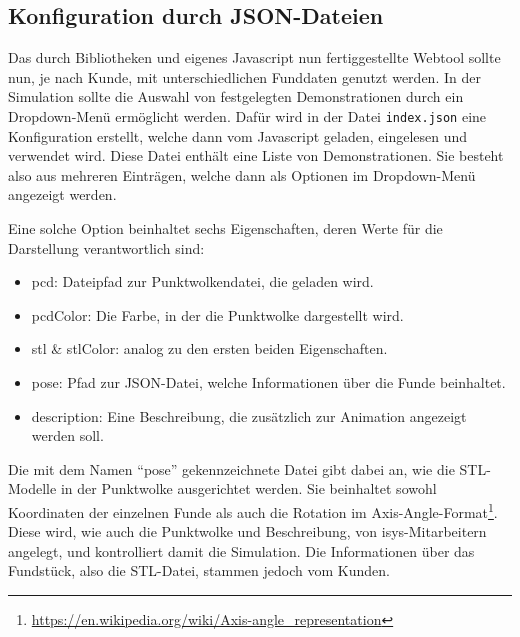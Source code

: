 \subsection{Konfiguration durch JSON-Dateien}

Das durch Bibliotheken und eigenes Javascript nun fertiggestellte Webtool sollte nun, je nach Kunde, mit unterschiedlichen Funddaten genutzt werden. In der Simulation sollte die Auswahl von festgelegten Demonstrationen durch ein Dropdown-Menü ermöglicht werden. Dafür wird in der Datei \texttt{index.json} eine Konfiguration erstellt, welche dann vom Javascript geladen, eingelesen und verwendet wird. Diese Datei enthält eine Liste von Demonstrationen. Sie besteht also aus mehreren Einträgen, welche dann als Optionen im Dropdown-Menü angezeigt werden.

\begin{code}
\end{code}

Eine solche Option beinhaltet sechs Eigenschaften, deren Werte für die Darstellung verantwortlich sind:

\begin{itemize}
	\item pcd: Dateipfad zur Punktwolkendatei, die geladen wird.
	\item pcdColor: Die Farbe, in der die Punktwolke dargestellt wird.
	\item stl \& stlColor: analog zu den ersten beiden Eigenschaften.
	\item pose: Pfad zur JSON-Datei, welche Informationen über die Funde beinhaltet.
	\item description: Eine Beschreibung, die zusätzlich zur Animation angezeigt werden soll.
\end{itemize}

Die mit dem Namen ``pose'' gekennzeichnete Datei gibt dabei an, wie die STL-Modelle in der Punktwolke ausgerichtet werden. Sie beinhaltet sowohl Koordinaten der einzelnen Funde als auch die Rotation im Axis-Angle-Format\footnote{\url{https://en.wikipedia.org/wiki/Axis-angle_representation}}. Diese wird, wie auch die Punktwolke und Beschreibung, von isys-Mitarbeitern angelegt, und kontrolliert damit die Simulation. Die Informationen über das Fundstück, also die STL-Datei, stammen jedoch vom Kunden.
